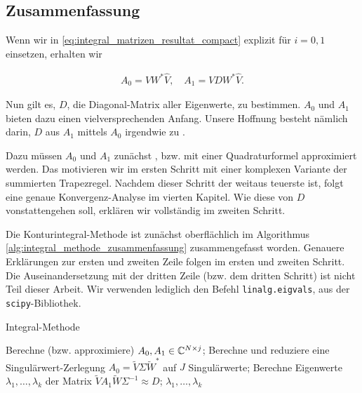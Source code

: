 \subsection*{Zusammenfassung}

Wenn wir in \eqref{eq:integral_matrizen_resultat_compact} explizit für $i = 0, 1$ einsetzen, erhalten wir

\begin{align} \label{eq:integral_matrizen_resultat}
    A_0 = V W^\ast \hat V,
    \quad
    A_1 = V D W^\ast \hat V.
\end{align}

Nun gilt es, $D$, die Diagonal-Matrix aller Eigenwerte, zu bestimmen.
$A_0$ und $A_1$ bieten dazu einen vielversprechenden Anfang.
Unsere Hoffnung besteht nämlich darin, $D$ aus $A_1$ mittels $A_0$ irgendwie zu .

Dazu müssen $A_0$ und $A_1$ zunächst , bzw. mit einer Quadraturformel approximiert werden.
Das motivieren wir im ersten Schritt mit einer komplexen Variante der summierten Trapezregel.
Nachdem dieser Schritt der weitaus teuerste ist, folgt eine genaue Konvergenz-Analyse im vierten Kapitel.
Wie diese  von $D$ vonstattengehen soll, erklären wir vollständig im zweiten Schritt.

Die Konturintegral-Methode ist zunächst oberflächlich im Algorithmus \ref{alg:integral_methode_zusammenfassung} zusammengefasst worden.
Genauere Erklärungen zur ersten und zweiten Zeile folgen im ersten und zweiten Schritt.
Die Auseinandersetzung mit der dritten Zeile (bzw. dem dritten Schritt) ist nicht Teil dieser Arbeit.
Wir verwenden lediglich den Befehl \texttt{linalg.eigvals}, aus der \texttt{scipy}-Bibliothek.

\begin{algorithm}[H]
	\caption{Integral-Methode}
    \begin{algorithmic}[0]
            \State Berechne (bzw. approximiere) $A_0, A_1 \in \mathbb{C}^{N \times j}$;
            \State Berechne und reduziere eine Singulärwert-Zerlegung $A_0 = \tilde V \Sigma \tilde W^\ast$ auf $J$ Singulärwerte;
            \State Berechne Eigenwerte $\lambda_1, \dots, \lambda_k$ der Matrix $\tilde V A_1 \tilde W \Sigma^{-1} \approx D$;
            \State \Return $\lambda_1, \dots, \lambda_k$
		\EndProcedure
    \end{algorithmic}
    \caption{}
    \label{alg:integral_methode_zusammenfassung}
\end{algorithm}
